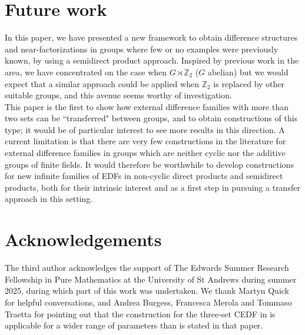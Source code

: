 \documentclass[12pt, a4paper]{article}
\theoremstyle{definition}
\begin{document}
\section{Future work}
In this paper, we have presented a new framework to obtain difference structures and near-factorizations in groups where few or no examples were previously known, by using a semidirect product approach.  Inspired by previous work in the area, we have concentrated on the case when $G \rtimes \mathbb{Z}_2$ ($G$ abelian) but we would expect that a similar approach could be applied when $\mathbb{Z}_2$ is replaced by other suitable groups, and this avenue seems worthy of investigation.\\
This paper is the first to show how external difference families with more than two sets can be ``transferred" between groups, and to obtain constructions of this type; it would be of particular interest to see more results in this direction.  A current limitation is that there are very few constructions in the literature for external difference families in groups which are neither cyclic nor the additive groups of finite fields. It would therefore be worthwhile to develop constructions for new infinite families of EDFs in non-cyclic direct products and semidirect products, both for their intrinsic interest and as a first step in pursuing a transfer approach in this setting.

\section{Acknowledgements}
The third author acknowledges the support of The Edwards Summer Research Fellowship in Pure Mathematics at the University of St Andrews during summer 2025, during which part of this work was undertaken.  We thank Martyn Quick for helpful conversations, and Andrea Burgess, Francesca Merola and Tommaso Traetta for pointing out that the construction for the three-set CEDF in \cite{HucJefMcC} is applicable for a wider range of parameters than is stated in that paper.
\end{document}
